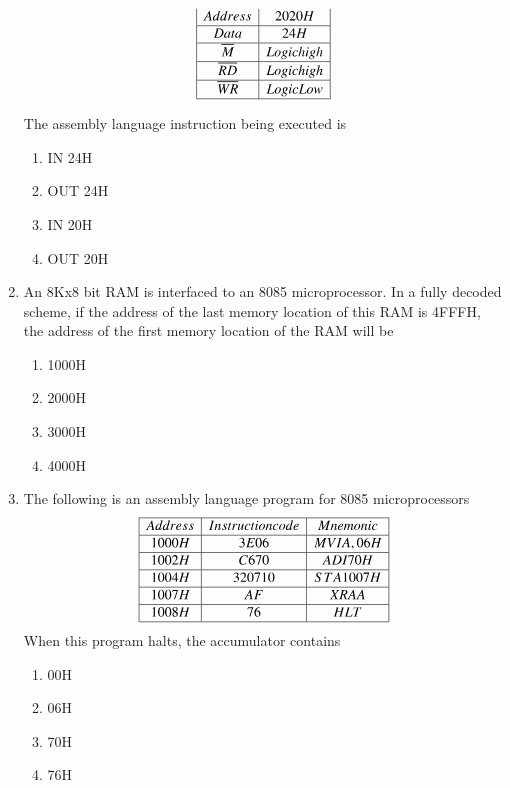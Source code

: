 \documentclass[journal,12pt,twocolumn]{IEEEtran}
\begin{document}
\begin{enumerate}
\begin{displaymath}
\begin{array}{|c|c|}
Address & 2020H  \\\hline
Data & 24H  \\ \hline
{\overline{M}} & Logic high    \\\hline
{\overline{RD}} & Logic high  \\\hline
{\overline{WR}} & Logic Low  \\\hline
\end{array}
\end{displaymath}

The assembly language instruction being executed is\\
      \begin{enumerate}
      \item IN 24H
      \item OUT 24H
      \item IN 20H
      \item OUT 20H
    \end{enumerate}
    \item An 8Kx8 bit RAM is interfaced to an 8085 microprocessor. In a fully decoded
scheme, if the address of the last memory location of this RAM is 4FFFH, the
address of the first memory location of the RAM will be 
      \begin{enumerate}                  
      \item 1000H
      \item 2000H
      \item 3000H
      \item 4000H
      \end{enumerate}
\item The following is an assembly language program for 8085 microprocessors
\begin{displaymath}
\begin{array}{|c|c|c|} \hline


Address & Instruction code & Mnemonic   \\\hline
1000H & 3E06 & MVI A, 06H \\ \hline
1002H & C6 70 & ADI 70H    \\\hline
1004H & 32 07 10 & STA 1007H  \\\hline
1007H & AF & XRA A \\\hline
1008H & 76 & HLT \\\hline
\end{array}
\end{displaymath}
When this program halts, the accumulator contains
     \begin{enumerate}
      \item 00H
      \item 06H
      \item 70H
      \item 76H
    \end{enumerate}    
   

\end{enumerate}
\end{document}
